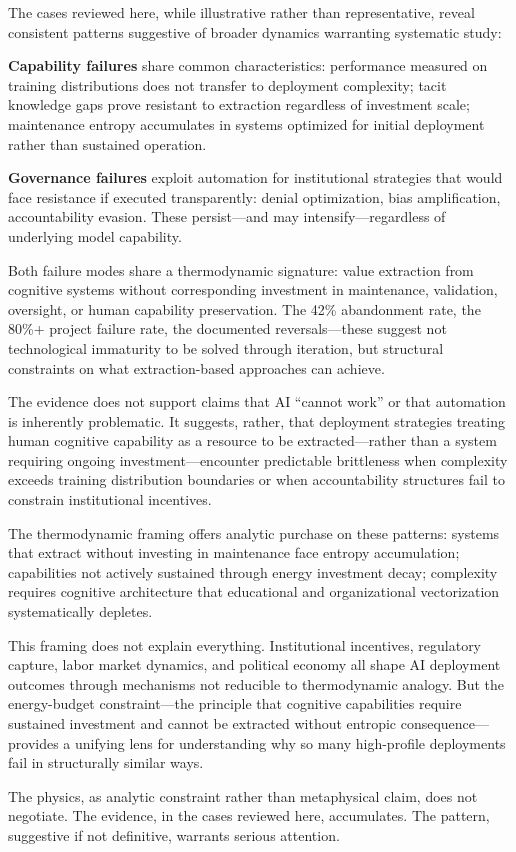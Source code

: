 The cases reviewed here, while illustrative rather than representative, reveal consistent patterns suggestive of broader dynamics warranting systematic study:

\textbf{Capability failures} share common characteristics: performance measured on training distributions does not transfer to deployment complexity; tacit knowledge gaps prove resistant to extraction regardless of investment scale; maintenance entropy accumulates in systems optimized for initial deployment rather than sustained operation.

\textbf{Governance failures} exploit automation for institutional strategies that would face resistance if executed transparently: denial optimization, bias amplification, accountability evasion. These persist---and may intensify---regardless of underlying model capability.

Both failure modes share a thermodynamic signature: value extraction from cognitive systems without corresponding investment in maintenance, validation, oversight, or human capability preservation. The 42\% abandonment rate, the 80\%+ project failure rate, the documented reversals---these suggest not technological immaturity to be solved through iteration, but structural constraints on what extraction-based approaches can achieve.

The evidence does not support claims that AI ``cannot work'' or that automation is inherently problematic. It suggests, rather, that deployment strategies treating human cognitive capability as a resource to be extracted---rather than a system requiring ongoing investment---encounter predictable brittleness when complexity exceeds training distribution boundaries or when accountability structures fail to constrain institutional incentives.

The thermodynamic framing offers analytic purchase on these patterns: systems that extract without investing in maintenance face entropy accumulation; capabilities not actively sustained through energy investment decay; complexity requires cognitive architecture that educational and organizational vectorization systematically depletes.

This framing does not explain everything. Institutional incentives, regulatory capture, labor market dynamics, and political economy all shape AI deployment outcomes through mechanisms not reducible to thermodynamic analogy. But the energy-budget constraint---the principle that cognitive capabilities require sustained investment and cannot be extracted without entropic consequence---provides a unifying lens for understanding why so many high-profile deployments fail in structurally similar ways.

The physics, as analytic constraint rather than metaphysical claim, does not negotiate. The evidence, in the cases reviewed here, accumulates. The pattern, suggestive if not definitive, warrants serious attention.
